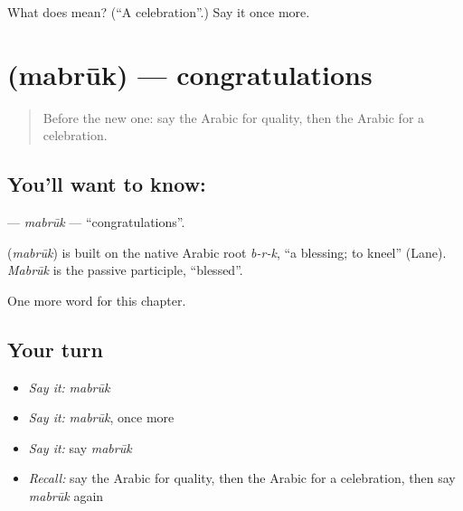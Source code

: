 \begin{tcolorbox}[breakable,colback=teal!4,colframe=teal!35!black,title={Before you move on}]
What does  mean? (\textquotedblleft{}A celebration\textquotedblright{}.) Say it once more.
\end{tcolorbox}
\section[\texorpdfstring{\ar{مبروك} (mabrūk)}{مبروك (mabrūk)}]{ (mabrūk) — congratulations}

\label{lesson:AR-C249-mabruk}



\begin{quote}
Before the new one: say the Arabic for quality, then the Arabic for a celebration.
\end{quote}

\subsection*{You'll want to know: }
\textbf{} — \emph{mabrūk} — \textquotedblleft{}congratulations\textquotedblright{}.

\begin{cousinweb}
\textbf{} (\emph{mabrūk}) is built on the native Arabic root \emph{b-r-k}, \textquotedblleft{}a blessing; to kneel\textquotedblright{} (Lane). \emph{Mabrūk} is the passive participle, \textquotedblleft{}blessed\textquotedblright{}.
\end{cousinweb}

\begin{grammarlens}[title={What you've built}]
One more word for this chapter.
\end{grammarlens}

\subsection*{Your turn}
\begin{itemize}
\raggedright
  \item \emph{Say it:} \emph{mabrūk}
  \item \emph{Say it:} \emph{mabrūk}, once more
  \item \emph{Say it:} say \emph{mabrūk}
  \item \emph{Recall:} say the Arabic for quality, then the Arabic for a celebration, then say \emph{mabrūk} again
\end{itemize}

